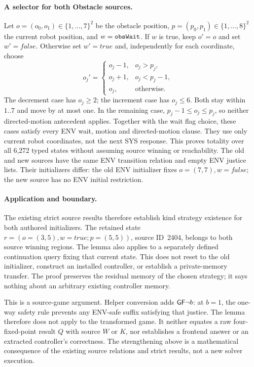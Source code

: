 \paragraph{A selector for both Obstacle sources.}
Let $o=(o_0,o_1)\in\{1,\ldots,7\}^2$ be the obstacle position,
$p=(p_0,p_1)\in\{1,\ldots,8\}^2$ the current robot position, and
$w=\texttt{obsWait}$. If $w$ is true, keep $o'=o$ and set $w'=\mathit{false}$.
Otherwise set $w'=\mathit{true}$ and, independently for each coordinate,
choose
\[
 o_j'=\begin{cases}
 o_j-1,&o_j>p_j,\\
 o_j+1,&o_j<p_j-1,\\
 o_j,&\text{otherwise}.
 \end{cases}
\]
The decrement case has $o_j\ge2$; the increment case has $o_j\le6$.
Both stay within $1..7$ and move by at most one. In the remaining case,
$p_j-1\le o_j\le p_j$, so neither directed-motion antecedent applies.
Together with the wait flag choice, these cases satisfy every ENV
wait, motion and directed-motion clause. They use only current robot
coordinates, not the next SYS response. This proves totality over all
6,272 typed states without assuming source winning or reachability.
The old and new sources have the same ENV transition relation and empty
ENV justice lists. Their initializers differ: the old ENV initializer
fixes $o=(7,7),w=\mathit{false}$; the new source has no ENV initial
restriction.

\paragraph{Application and boundary.}
The existing strict source results therefore establish kind strategy
existence for both authored initializers. The retained state
$r=(o=(3,5),w=\mathit{true};p=(5,5))$, source ID~2404, belongs to both
source winning regions. The lemma also applies to a separately defined
continuation query fixing that current state. This does not reset to the
old initializer, construct an installed controller, or establish a
private-memory transfer. The proof preserves the residual memory of the
chosen strategy; it says nothing about an arbitrary existing controller
memory.

This is a source-game argument. Helper conversion adds
$\mathsf{G}\mathsf{F}\neg b$: at $b=1$, the one-way safety rule prevents any ENV-safe
suffix satisfying that justice. The lemma therefore does not apply to
the transformed game. It neither equates a raw four-fixed-point result
$Q$ with source $W$ or $K$, nor establishes a frontend answer or an
extracted controller's correctness. The strengthening above is a
mathematical consequence of the existing source relations and strict
results, not a new solver execution.

